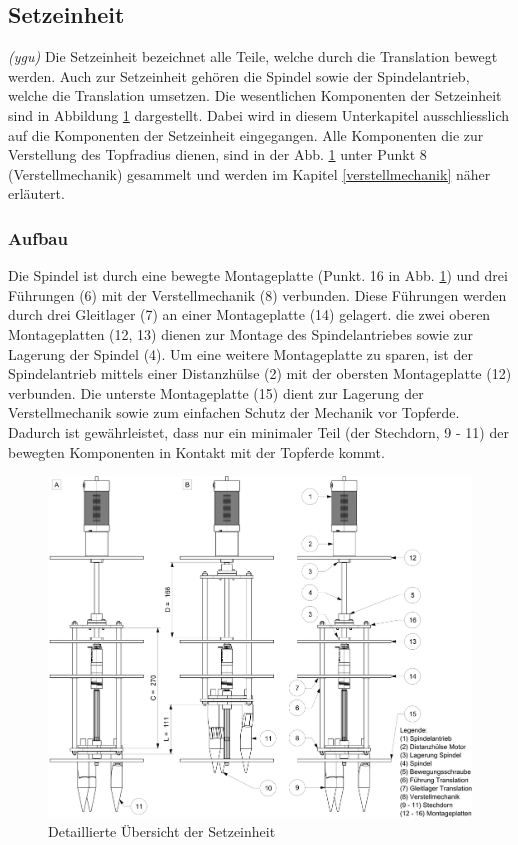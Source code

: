 \subsection{Setzeinheit} \label{sec:Setzeinheit}
\textit{(ygu)} Die Setzeinheit bezeichnet alle Teile, welche durch die Translation bewegt werden. Auch zur Setzeinheit gehören die Spindel sowie der Spindelantrieb, welche die Translation umsetzen.
\newline
Die wesentlichen Komponenten der Setzeinheit sind in Abbildung \ref{fig:setzeinheit} dargestellt. Dabei wird in diesem Unterkapitel ausschliesslich auf die Komponenten der Setzeinheit eingegangen. Alle Komponenten die zur Verstellung des Topfradius dienen, sind in der Abb.  \ref{fig:setzeinheit} unter Punkt 8 (Verstellmechanik) gesammelt und werden im Kapitel \ref{verstellmechanik} näher erläutert.
\newline

\subsubsection{Aufbau}
Die Spindel ist durch eine bewegte Montageplatte (Punkt. 16 in Abb. \ref{fig:setzeinheit}) und drei Führungen (6) mit der Verstellmechanik (8) verbunden. Diese Führungen werden durch drei Gleitlager (7)  an einer Montageplatte (14) gelagert. die zwei oberen Montageplatten (12, 13) dienen zur Montage des Spindelantriebes sowie zur Lagerung der Spindel (4). Um eine weitere Montageplatte zu sparen, ist der Spindelantrieb mittels einer Distanzhülse (2) mit der obersten Montageplatte (12) verbunden. Die unterste Montageplatte (15) dient zur Lagerung der Verstellmechanik sowie zum einfachen Schutz der Mechanik vor Topferde. Dadurch ist gewährleistet, dass nur ein minimaler Teil (der Stechdorn, 9 - 11) der bewegten Komponenten in Kontakt mit der Topferde kommt.
	\begin{figure}[H]
	\includegraphics[scale=0.53]{Illustrationen/6-Umsetzung/setzeinheit_aio.jpg}
	\caption{Detaillierte Übersicht der Setzeinheit}
	\label{fig:setzeinheit}
\end{figure}

